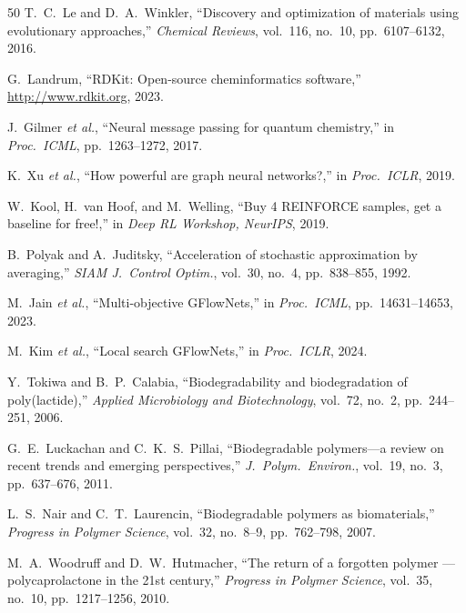 \documentclass[twocolumn,10pt]{article}
\begin{document}
\begin{thebibliography}{50}
T.~C.~Le and D.~A.~Winkler, ``Discovery and optimization of materials using evolutionary approaches,'' \textit{Chemical Reviews}, vol.~116, no.~10, pp.~6107--6132, 2016.

G.~Landrum, ``RDKit: Open-source cheminformatics software,'' \url{http://www.rdkit.org}, 2023.

J.~Gilmer \textit{et al.}, ``Neural message passing for quantum chemistry,'' in \textit{Proc.\ ICML}, pp.~1263--1272, 2017.

K.~Xu \textit{et al.}, ``How powerful are graph neural networks?,'' in \textit{Proc.\ ICLR}, 2019.

W.~Kool, H.~van Hoof, and M.~Welling, ``Buy 4 REINFORCE samples, get a baseline for free!,'' in \textit{Deep RL Workshop, NeurIPS}, 2019.

B.~Polyak and A.~Juditsky, ``Acceleration of stochastic approximation by averaging,'' \textit{SIAM J.\ Control Optim.}, vol.~30, no.~4, pp.~838--855, 1992.


M.~Jain \textit{et al.}, ``Multi-objective GFlowNets,'' in \textit{Proc.\ ICML}, pp.~14631--14653, 2023.

M.~Kim \textit{et al.}, ``Local search GFlowNets,'' in \textit{Proc.\ ICLR}, 2024.

Y.~Tokiwa and B.~P.~Calabia, ``Biodegradability and biodegradation of poly(lactide),'' \textit{Applied Microbiology and Biotechnology}, vol.~72, no.~2, pp.~244--251, 2006.

G.~E.~Luckachan and C.~K.~S.~Pillai, ``Biodegradable polymers---a review on recent trends and emerging perspectives,'' \textit{J.\ Polym.\ Environ.}, vol.~19, no.~3, pp.~637--676, 2011.

L.~S.~Nair and C.~T.~Laurencin, ``Biodegradable polymers as biomaterials,'' \textit{Progress in Polymer Science}, vol.~32, no.~8--9, pp.~762--798, 2007.

M.~A.~Woodruff and D.~W.~Hutmacher, ``The return of a forgotten polymer --- polycaprolactone in the 21st century,'' \textit{Progress in Polymer Science}, vol.~35, no.~10, pp.~1217--1256, 2010.


\end{thebibliography}
\end{document}
